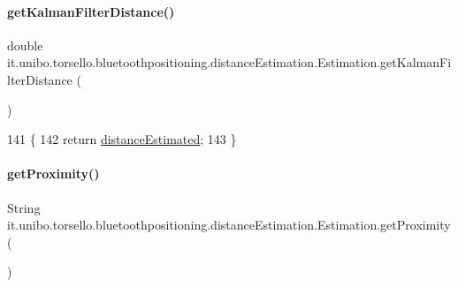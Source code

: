 \paragraph{\texorpdfstring{get\+Kalman\+Filter\+Distance()}{getKalmanFilterDistance()}}
{\footnotesize\ttfamily double it.\+unibo.\+torsello.\+bluetoothpositioning.\+distance\+Estimation.\+Estimation.\+get\+Kalman\+Filter\+Distance (\begin{DoxyParamCaption}{ }\end{DoxyParamCaption})}


\begin{DoxyCode}
141                                             \{
142         \textcolor{keywordflow}{return} \hyperlink{classit_1_1unibo_1_1torsello_1_1bluetoothpositioning_1_1distanceEstimation_1_1Estimation_a7a5514b25ac6495842a53e54319be10d_a7a5514b25ac6495842a53e54319be10d}{distanceEstimated};
143     \}
\end{DoxyCode}
\hypertarget{classit_1_1unibo_1_1torsello_1_1bluetoothpositioning_1_1distanceEstimation_1_1Estimation_a2edfb9f301730647277474c61b41dbd5_a2edfb9f301730647277474c61b41dbd5}{}\label{classit_1_1unibo_1_1torsello_1_1bluetoothpositioning_1_1distanceEstimation_1_1Estimation_a2edfb9f301730647277474c61b41dbd5_a2edfb9f301730647277474c61b41dbd5} 
\paragraph{\texorpdfstring{get\+Proximity()}{getProximity()}}
{\footnotesize\ttfamily String it.\+unibo.\+torsello.\+bluetoothpositioning.\+distance\+Estimation.\+Estimation.\+get\+Proximity (\begin{DoxyParamCaption}{ }\end{DoxyParamCaption})}



